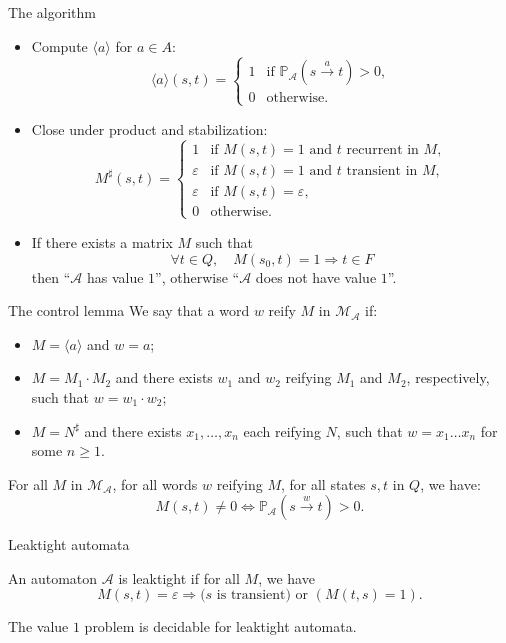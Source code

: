 \documentclass[svgnames]{beamer}
\renewcommand{\AA}{\mathcal{A}}
\newcommand{\MM}{\mathcal{M}}
\newcommand{\MMAA}{\MM_\AA}
\newcommand{\tr}[1]{\langle #1 \rangle}
\newcommand{\prob}[1]{\mathbb{P}_{#1}}
\begin{document}
\begin{frame}{The algorithm}
\begin{itemize}
	\item Compute $\tr{a}$ for $a \in A$:
$$\tr{a}(s,t) = 
\left\{\begin{array}{ll}
1 & \textrm{if } \prob{\AA}(s \xrightarrow{a} t) > 0,\\
0 & \textrm{otherwise.}
\end{array}\right.$$	
	\item Close under product and stabilization:
$$M^\sharp(s,t) = 
\left\{\begin{array}{ll}
1 & \textrm{if } M(s,t) = 1 \textrm{ and } t \textrm{ recurrent in } M,\\
\varepsilon & \textrm{if } M(s,t) = 1 \textrm{ and } t \textrm{ transient in } M,\\
\varepsilon & \textrm{if } M(s,t) = \varepsilon,\\
0 & \textrm{otherwise.}
\end{array}\right.$$
	\item \pause If there exists a matrix $M$ such that 
	$$\forall t \in Q, \quad M(s_0,t) = 1 \Rightarrow t \in F$$
	then ``$\AA$ has value $1$'',
	otherwise ``$\AA$ does not have value $1$''.
\end{itemize}
\end{frame}

\begin{frame}{The control lemma}
We say that a word $w$ reify $M$ in $\MMAA$ if:
\begin{itemize}
	\item $M = \tr{a}$ and $w = a$;
	\item $M = M_1 \cdot M_2$ and there exists 
$w_1$ and $w_2$ reifying $M_1$ and $M_2$, respectively,
such that $w = w_1 \cdot w_2$;
	\item $M = N^\sharp$ and there exists $x_1,\ldots,x_n$ each reifying $N$,
such that $w = x_1 \ldots x_n$ for some $n \geq 1$.
\end{itemize}

\pause
\begin{lemma}
For all $M$ in $\MMAA$, for all words $w$ reifying $M$, 
for all states $s,t$ in $Q$, we have:
$$M(s,t) \neq 0 \Longleftrightarrow 
\prob{\AA}(s \xrightarrow{w} t) > 0.$$
\end{lemma}
\end{frame}

\begin{frame}{Leaktight automata}
\begin{definition}
An automaton $\AA$ is leaktight if for all $M$,
we have
$$M(s,t) = \varepsilon \Longrightarrow (s \textrm{ is transient) or } (M(t,s) = 1).$$
\end{definition}
\pause

\begin{theorem}
The value $1$ problem is decidable for leaktight automata.
\end{theorem}
\end{frame}
\end{document}
